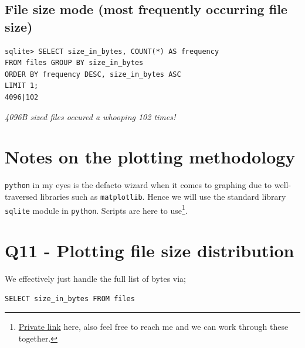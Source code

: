 \documentclass{article}
\begin{document}
\subsection*{File size mode (most frequently occurring file size)}
\begin{small}
\begin{verbatim}
sqlite> SELECT size_in_bytes, COUNT(*) AS frequency
FROM files GROUP BY size_in_bytes
ORDER BY frequency DESC, size_in_bytes ASC
LIMIT 1;
4096|102
\end{verbatim}
\end{small}
\textit{4096B sized files occured a whooping 102 times!}

\section*{Notes on the plotting methodology}
\texttt{python} in my eyes is the defacto wizard when it comes to graphing due to well-traversed libraries such as \texttt{matplotlib}. Hence we will use the standard library \texttt{sqlite} module in \texttt{python}. Scripts are here to use\footnote{\href{https://gitfront.io/r/user-5047466/ZFVr4eV9CukU/cs742-published-scripts/}{Private link} here, also feel free to reach me and we can work through these together.}.

\section*{Q11 - Plotting file size distribution}
We effectively just handle the full list of bytes via;

\begin{small}
\begin{verbatim}
SELECT size_in_bytes FROM files
\end{verbatim}
\end{small}
\end{document}

